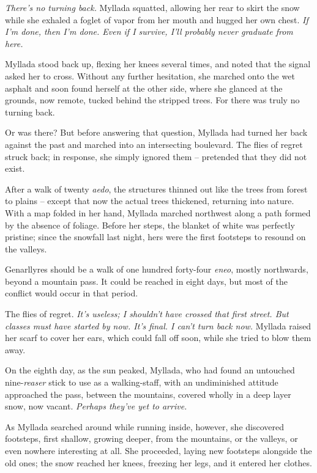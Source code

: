 \emph{There's no turning back.} Myllada squatted, allowing her rear to skirt the snow while she exhaled a foglet of vapor from her mouth and hugged her own chest. \emph{If I'm done, then I'm done. Even if I survive, I'll probably never graduate from here.}

Myllada stood back up, flexing her knees several times, and noted that the signal asked her to cross. Without any further hesitation, she marched onto the wet asphalt and soon found herself at the other side, where she glanced at the grounds, now remote, tucked behind the stripped trees. For there was truly no turning back.

Or was there? But before answering that question, Myllada had turned her back against the past and marched into an intersecting boulevard. The flies of regret struck back; in response, she simply ignored them -- pretended that they did not exist.

\centeredstars

After a walk of twenty \emph{aedo}, the structures thinned out like the trees from forest to plains -- except that now the actual trees thickened, returning into nature. With a map folded in her hand, Myllada marched northwest along a path formed by the absence of foliage. Before her steps, the blanket of white was perfectly pristine; since the snowfall last night, hers were the first footsteps to resound on the valleys.

Genarllyres should be a walk of one hundred forty-four \emph{eneo}, mostly northwards, beyond a mountain pass. It could be reached in eight days, but most of the conflict would occur in that period.

The flies of regret. \emph{It's useless; I shouldn't have crossed that first street. But classes must have started by now. It's final. I can't turn back now.} Myllada raised her scarf to cover her ears, which could fall off soon, while she tried to blow them away.

\centeredstars

On the eighth day, as the sun peaked, Myllada, who had found an untouched nine-\emph{reaser} stick to use as a walking-staff, with an undiminished attitude approached the pass, between the mountains, covered wholly in a deep layer snow, now vacant. \emph{Perhaps they've yet to arrive.}

As Myllada searched around while running inside, however, she discovered footsteps, first shallow, growing deeper, from the mountains, or the valleys, or even nowhere interesting at all. She proceeded, laying new footsteps alongside the old ones; the snow reached her knees, freezing her legs, and it entered her clothes.

